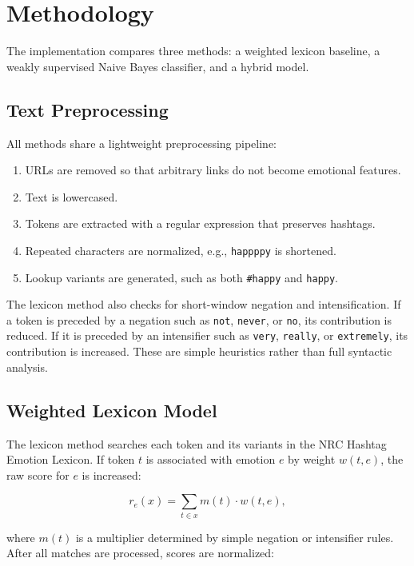 \section{Methodology}

The implementation compares three methods: a weighted lexicon baseline, a weakly supervised Naive Bayes classifier, and a hybrid model.

\subsection{Text Preprocessing}

All methods share a lightweight preprocessing pipeline:

\begin{enumerate}
    \item URLs are removed so that arbitrary links do not become emotional features.
    \item Text is lowercased.
    \item Tokens are extracted with a regular expression that preserves hashtags.
    \item Repeated characters are normalized, e.g., \texttt{happppy} is shortened.
    \item Lookup variants are generated, such as both \texttt{\#happy} and \texttt{happy}.
\end{enumerate}

The lexicon method also checks for short-window negation and intensification. If a token is preceded by a negation such as \texttt{not}, \texttt{never}, or \texttt{no}, its contribution is reduced. If it is preceded by an intensifier such as \texttt{very}, \texttt{really}, or \texttt{extremely}, its contribution is increased. These are simple heuristics rather than full syntactic analysis.

\subsection{Weighted Lexicon Model}

The lexicon method searches each token and its variants in the NRC Hashtag Emotion Lexicon. If token $t$ is associated with emotion $e$ by weight $w(t,e)$, the raw score for $e$ is increased:

\[
r_e(x) = \sum_{t \in x} m(t) \cdot w(t,e),
\]

where $m(t)$ is a multiplier determined by simple negation or intensifier rules. After all matches are processed, scores are normalized:


